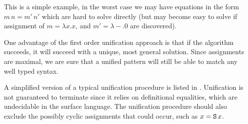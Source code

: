 This is a simple example, in the worst case we may have equations in the form $m\,n=m'\,n'$ which are hard to solve directly (but may become easy to solve if assignment of $m=\lambda x.x$, and $m'=\lambda-.0$ are discovered).

One advantage of the first order unification approach is that if the algorithm succeeds, it will succeed with a unique, most general solution.
Since assignments are maximal, we are sure that a unified pattern will still be able to match any well typed syntax.

A simplified version of a typical unification procedure is listed in .
Unification is not guaranteed to terminate since it relies on definitional equalities, which are undecidable in the surface language.
The unification procedure should also exclude the possibly cyclic assignments that could occur, such as $x=\mathtt{S}{}\,x$.

